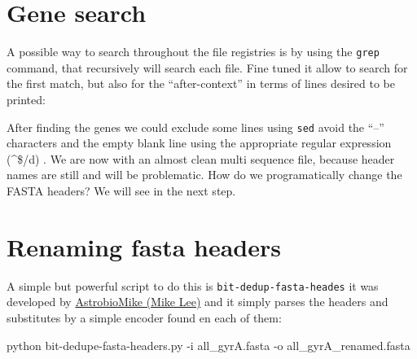 \documentclass[
  letterpaper,
]{scrbook}
\newenvironment{Shaded}{\begin{snugshade}}{\end{snugshade}}
\newcommand{\AttributeTok}[1]{\textcolor[rgb]{0.40,0.46,0.14}{#1}}
\newcommand{\DataTypeTok}[1]{\textcolor[rgb]{0.68,0.00,0.00}{#1}}
\newcommand{\ExtensionTok}[1]{\textcolor[rgb]{0.00,0.46,0.62}{#1}}
\newcommand{\FunctionTok}[1]{\textcolor[rgb]{0.28,0.35,0.67}{#1}}
\newcommand{\KeywordTok}[1]{\textcolor[rgb]{0.00,0.46,0.62}{#1}}
\newcommand{\NormalTok}[1]{\textcolor[rgb]{0.00,0.46,0.62}{#1}}
\newcommand{\PreprocessorTok}[1]{\textcolor[rgb]{0.68,0.00,0.00}{#1}}
\newcommand{\StringTok}[1]{\textcolor[rgb]{0.13,0.47,0.30}{#1}}
\begin{document}
\hypertarget{gene-search}{%
\section*{Gene search}\label{gene-search}}

A possible way to search throughout the file registries is by using the
\texttt{grep} command, that recursively will search each file. Fine
tuned it allow to search for the first match, but also for the
``after-context'' in terms of lines desired to be printed:

\begin{Shaded}
\end{Shaded}

After finding the genes we could exclude some lines using \texttt{sed}
avoid the ``--'' characters and the empty blank line using the
appropriate regular expression (\^{}\$/d) . We are now with an almost
clean multi sequence file, because header names are still and will be
problematic. How do we programatically change the FASTA headers? We will
see in the next step.

\hypertarget{renaming-fasta-headers}{%
\section*{Renaming fasta headers}\label{renaming-fasta-headers}}

A simple but powerful script to do this is
\texttt{bit-dedup-fasta-heades} it was developed by
\href{https://github.com/AstrobioMike}{AstrobioMike (Mike Lee)} and it
simply parses the headers and substitutes by a simple encoder found en
each of them:

\begin{Shaded}
\begin{Highlighting}[]
\ExtensionTok{python}\NormalTok{ bit{-}dedupe{-}fasta{-}headers.py }\AttributeTok{{-}i}\NormalTok{ all\_gyrA.fasta }\AttributeTok{{-}o}\NormalTok{ all\_gyrA\_renamed.fasta}
\end{Highlighting}
\end{Shaded}
\end{document}
